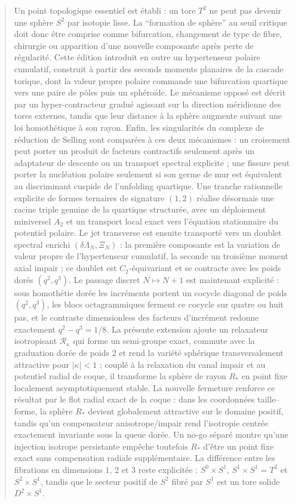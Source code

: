 \documentclass[11pt,a4paper]{article}
\begin{document}
\begin{abstract}
Un point topologique essentiel est établi : un tore $T^2$ ne peut pas devenir une sphère $S^2$ par isotopie lisse. La ``formation de sphère'' au seuil critique doit donc être comprise comme bifurcation, changement de type de fibre, chirurgie ou apparition d'une nouvelle composante après perte de régularité. Cette édition introduit en outre un hypertenseur polaire cumulatif, construit à partir des seconds moments planaires de la cascade torique, dont la valeur propre polaire commande une bifurcation quartique vers une paire de pôles puis un sphéroïde. Le mécanisme opposé est décrit par un hyper-contracteur gradué agissant sur la direction méridienne des tores externes, tandis que leur distance à la sphère augmente suivant une loi homothétique à son rayon. Enfin, les singularités du complexe de réduction de Selling sont comparées à ces deux mécanismes : un croisement peut porter un produit de facteurs contractifs seulement après un adaptateur de descente ou un transport spectral explicite ; une fissure peut porter la nucléation polaire seulement si son germe de mur est équivalent au discriminant cuspide de l'unfolding quartique. Une tranche rationnelle explicite de formes ternaires de signature $(1,2)$ réalise désormais une racine triple genuine de la quartique structurée, avec un déploiement miniversel $A_2$ et un transport local exact vers l'équation stationnaire du potentiel polaire. Le jet transverse est ensuite transporté vers un doublet spectral enrichi $(\delta\Lambda_N,\Xi_N)$ : la première composante est la variation de valeur propre de l'hypertenseur cumulatif, la seconde un troisième moment axial impair ; ce doublet est $C_2$-équivariant et se contracte avec les poids dorés $(q^2,q^3)$. Le passage discret $N\mapsto N+1$ est maintenant explicité : sous homothétie dorée les incréments portent un cocycle diagonal de poids $(q^2,q^3)$, les blocs octagrammiques ferment ce cocycle sur quatre ou huit pas, et le contraste dimensionless des facteurs d'incrément redonne exactement $q^2-q^3=1/8$. La présente extension ajoute un relaxateur isotropisant $\mathcal R_\kappa$ qui forme un semi-groupe exact, commute avec la graduation dorée de poids $2$ et rend la variété sphérique transversalement attractive pour $|\kappa|<1$ ; couplé à la relaxation du canal impair et au potentiel radial de coque, il transforme la sphère de rayon $R_*$ en point fixe localement asymptotiquement stable. La nouvelle fermeture renforce ce résultat par le flot radial exact de la coque : dans les coordonnées taille--forme, la sphère $R_*$ devient globalement attractive sur le domaine positif, tandis qu'un compensateur anisotrope/impair rend l'isotropie centrée exactement invariante sous la queue dorée. Un no-go séparé montre qu'une injection isotrope persistante empêche toutefois $R_*$ d'être un point fixe exact sans compensation radiale supplémentaire. La différence entre les fibrations en dimensions $1$, $2$ et $3$ reste explicitée : $S^0\times S^1$, $S^1\times S^1=T^2$ et $S^2\times S^1$, tandis que le secteur positif de $S^2$ fibré par $S^1$ est un tore solide $D^2\times S^1$.
\end{abstract}
\end{document}
